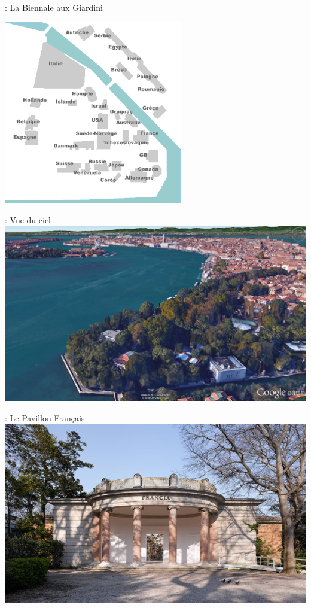 \documentclass[12pt]{beamer}
\begin{document}
            \begin{frame}{\subsecname: La Biennale aux Giardini}
                \vspace{-0.4cm}
                \begin{center}
                    \includegraphics[height=8cm]{img/giardini.png}
                \end{center}
            \end{frame}
            \begin{frame}{\subsecname: Vue du ciel}
                \includegraphics[width=\linewidth]{img/earth.png}
            \end{frame}
            \begin{frame}{\subsecname: Le Pavillon Français}
                \includegraphics[width=\linewidth]{img/pavillon.jpg}
            \end{frame}
\end{document}
